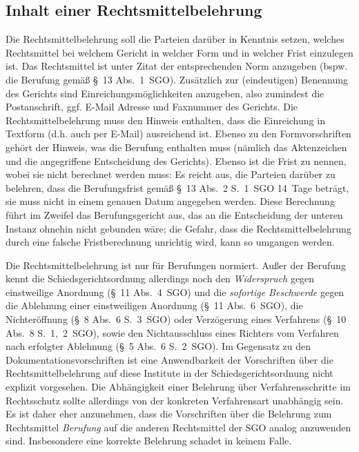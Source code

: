 \subsection{Inhalt einer Rechtsmittelbelehrung}
Die Rechtsmittelbelehrung soll die Parteien darüber in Kenntnis setzen, welches Rechtsmittel bei welchem Gericht in welcher Form und in welcher Frist einzulegen ist. Das Rechtsmittel ist unter Zitat der entsprechenden Norm anzugeben (bspw. die Berufung gemäß \S~13 Abs.~1~SGO). Zusätzlich zur (eindeutigen) Benennung des Gerichts sind Einreichungsmöglichkeiten anzugeben, also zumindest die Postanschrift, ggf. E-Mail Adresse und Faxnummer des Gerichts. Die Rechtsmittelbelehrung muss den Hinweis enthalten, dass die Einreichung in Textform (d.h. auch per E-Mail) ausreichend ist. Ebenso zu den Formvorschriften gehört der Hinweis, was die Berufung enthalten muss (nämlich das Aktenzeichen und die angegriffene Entscheidung des Gerichts). Ebenso ist die Frist zu nennen, wobei sie nicht berechnet werden muss: Es reicht aus, die Parteien darüber zu belehren, dass die Berufungsfrist gemäß \S~13 Abs.~2 S.~1~SGO 14~Tage beträgt, sie muss nicht in einem genauen Datum angegeben werden. Diese Berechnung führt im Zweifel das Berufungsgericht aus, das an die Entscheidung der unteren Instanz ohnehin nicht gebunden wäre; die Gefahr, dass die Rechtsmittelbelehrung durch eine falsche Fristberechnung unrichtig wird, kann so umgangen werden.

Die Rechtsmittelbelehrung ist nur für Berufungen normiert. Außer der Berufung kennt die Schiedsgerichtsordnung allerdings noch den \emph{Widerspruch} gegen einstweilige Anordnung (\S~11 Abs.~4~SGO) und die \emph{sofortige Beschwerde} gegen die Ablehnung einer einstweiligen Anordnung (\S~11 Abs.~6~SGO), die Nichteröffnung (\S~8 Abs.~6 S.~3~SGO) oder Verzögerung eines Verfahrens (\S~10 Abs.~8 S.~1,~2~SGO), sowie den Nichtausschluss eines Richters vom Verfahren nach erfolgter Ablehnung (\S~5 Abs.~6 S.~2~SGO). Im Gegensatz zu den Dokumentationsvorschriften ist eine Anwendbarkeit der Vorschriften über die Rechtsmittelbelehrung auf diese Institute in der Schiedsgerichtsordnung nicht explizit vorgesehen. Die Abhängigkeit einer Belehrung über Verfahrensschritte im Rechtsschutz sollte allerdings von der konkreten Verfahrensart unabhängig sein. Es ist daher eher anzunehmen, dass die Vorschriften über die Belehrung zum Rechtsmittel \emph{Berufung} auf die anderen Rechtsmittel der SGO analog anzuwenden sind. Insbesondere eine korrekte Belehrung schadet in keinem Falle.

